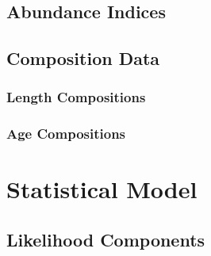 \documentclass[11pt,
  english,
  letterpaper,
]{article}
\begin{document}
\leavevmode\tagmcend\tagstructend


\hypertarget{abundance-indices}{%
\subsection{Abundance Indices}\label{abundance-indices}}

\leavevmode\tagmcend\tagstructend


\hypertarget{composition-data}{%
\subsection{Composition Data}\label{composition-data}}

\leavevmode\tagmcend\tagstructend


\hypertarget{length-compositions}{%
\subsubsection{Length Compositions}\label{length-compositions}}

\leavevmode\tagmcend\tagstructend


\hypertarget{age-compositions}{%
\subsubsection{Age Compositions}\label{age-compositions}}

\leavevmode\tagmcend\tagstructend


\hypertarget{statistical-model}{%
\section{Statistical Model}\label{statistical-model}}

\leavevmode\tagmcend\tagstructend


\hypertarget{likelihood-components}{%
\subsection{Likelihood Components}\label{likelihood-components}}
\end{document}
